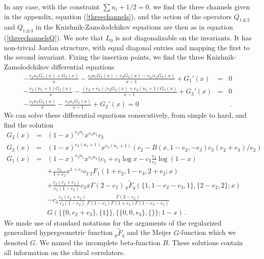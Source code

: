 \documentclass[12pt]{article}
\numberwithin{equation}{section}
\numberwithin{equation}{section}
\numberwithin{table}{section}\setlength{\multlinegap}{25pt}
\begin{document}
In any case, with the constraint $\sum n_i +1/2=0$, we find the three channels given in the appendix, equation (\ref{threechannels}),
 and the action of the operators  $Q_{1 \otimes 2}$ and $Q_{1 \otimes 3}$ in the Knizhnik-Zamolodchikov equations are then as
 in  equation (\ref{threechannelsQ}). We note that $L_0$ is not diagonalizable on the invariants. It has non-trivial Jordan structure,
 with equal diagonal entries and mapping the first to the second invariant. 
Fixing the insertion points, we find the three Knizhnik-Zamolodchikov  differential equations
\begin{eqnarray}
-\frac{{e_2 n_1 {G_1}(x)}+ {G_2}(x)}{x}-\frac{e_3 n_1 {G_1}(x)-{e_3
   {G_3}(x)}-e_3/e_2 G_2(x)}{x-1}+{G_1}'(x) &=& 0
\nonumber \\
-\frac{e_2(n_1+1) G_3(x)}{x}-\frac{ (e_2+e_3)/e_2 G_2(x) + {e_3 \left(n_1+1\right) {G_3}(x)}}{x-1}
+{G_3}'(x) &=& 0
\nonumber \\
-\frac{e_2 n_1 {G_2}(x)}{ x}-\frac{e_3 n_1 {G_2}(x)}{ x-1}+{G_2}'(x) = 0 &&  \, .
\end{eqnarray}
We can solve these differential equations consecutively, from simple to hard, and find the solution
\begin{eqnarray}
G_2 (x) &=& (1-x)^{e_3 n_1} x^{e_2 n_1} c_3
\nonumber \\
G_3(x) &=&
(1-x)^{e_3 (n_1+1)} x^{e_2 (n_1+1)} (c_2 - B(x,1-e_2,-e_3) c_3 (e_2+e_3)/e_2)
\nonumber \\
G_1(x) &=&  (1-x)^{e_3 n_1} x^{e_2 n_1} (c_1 + c_3  \log x - c_3 \frac{e_3}{e_2} \log (1-x) 
\nonumber \\
& & 
+ \frac{e_3}{1+e_2}
x^{1 + e_2} c_2 \, {}_2 F_1 (1+e_2,1-e_3,2+e_2;x)\nonumber \\
&& + \frac{e_3(e_2+e_3)}{e_2 (1-e_2)} c_3 x \Gamma(2-e_2) \, {}_p \tilde{F}_q(\{ 1,1-e_2-e_3,1 \} , \{ 2-e_2 , 2 \} ; x)\nonumber \\
&& - c_3 \frac{e_3(e_2+e_3)}{e_2(1-e_2)} \frac{\Gamma(2-e_2)}{\Gamma(1-e_2)\Gamma(1+e_3) \Gamma(1-e_2-e_3)} \nonumber \\
&&
G( \{ \{ 0, e_2+e_3 \} , \{ 1 \} \} , \{ \{ 0,0,e_3 \} , \{ \} \} ;1-x) \, . \label{3KZ}
\end{eqnarray}
We made use of standard notations for the arguments of the regularized generalized hypergeometric function ${}_p \tilde{F}_q$ and the 
Meijer $G$-function which we  denoted $G$. We named the incomplete beta-function $B$.
These solutions contain all information on the chiral correlators.
\end{document}
